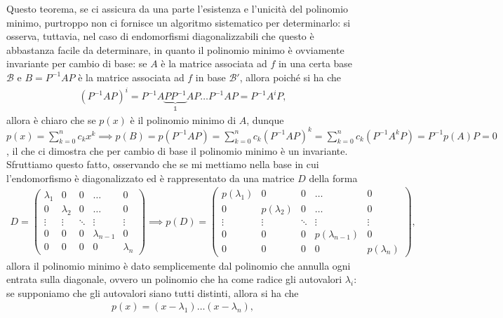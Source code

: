 Questo teorema, se ci assicura da una parte l'esistenza e l'unicità del polinomio minimo, purtroppo non ci fornisce un algoritmo sistematico per determinarlo: si osserva, tuttavia, nel caso di endomorfismi diagonalizzabili che questo è abbastanza facile da determinare, in quanto il polinomio minimo è ovviamente invariante per cambio di base: se $A$ è la matrice associata ad $f$
in una certa base $\mathcal{B}$ e $B = P^{-1} A P$ è la matrice associata ad $f$ in base $\mathcal{B}'$, allora poiché si ha che 
\begin{align}
(P^{-1} A P)^i = P^{-1} A \underbrace{P P^{-1}}_{\mathbb{1}} A P \ldots P^{-1} A P = P^{-1} A^i P,
\end{align}
allora è chiaro che se $p(x)$ è il polinomio minimo di $A$, dunque $p(x) = \sum\limits_{k=0}^n c_k x^k \implies p(B) = p(P^{-1} A P) = \sum\limits_{k=0}^n c_k (P^{-1} A P)^k = \sum\limits_{k=0}^n c_k (P^{-1} A^k P) = P^{-1} p(A) P = 0$, il che
ci dimostra che per cambio di base il polinomio minimo è un invariante.
Sfruttiamo questo fatto, osservando che se mi mettiamo nella base in cui l'endomorfismo è diagonalizzato ed è rappresentato da una matrice $D$ della forma
\begin{align}
    D = \begin{pmatrix}
        \lambda_1 & 0 & 0 & \ldots & 0 \\
        0 & \lambda_{2} & 0 & \ldots & 0 \\
        \vdots & \vdots & \ddots & \vdots & \vdots \\
        0 & 0 & 0 & \lambda_{n-1} & 0 \\
        0 & 0 & 0 & 0 & \lambda_n
    \end{pmatrix} \implies p(D) = \begin{pmatrix}
        p(\lambda_1) & 0 & 0 & \ldots & 0 \\
        0 & p(\lambda_{2}) & 0 & \ldots & 0 \\
        \vdots & \vdots & \ddots & \vdots & \vdots \\
        0 & 0 & 0 & p(\lambda_{n-1}) & 0 \\
        0 & 0 & 0 & 0 & p(\lambda_n)
    \end{pmatrix},
\end{align}
allora il polinomio minimo è dato semplicemente dal polinomio che annulla ogni entrata sulla diagonale, ovvero un polinomio che ha come radice gli autovalori $\lambda_i$: se supponiamo che gli autovalori siano tutti distinti, allora si ha che
\begin{align}
    p(x) = (x - \lambda_1) \ldots (x - \lambda_n),
\end{align}
